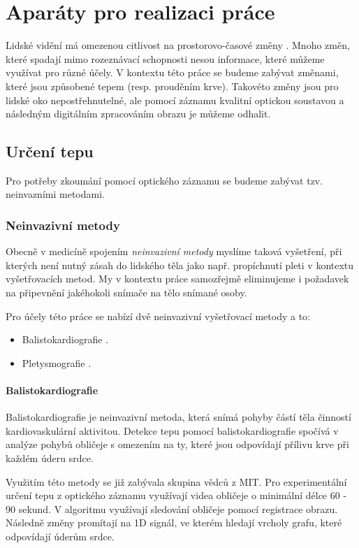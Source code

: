 \documentclass[
  digital, %
  table,   %
%
  lof,     %
  lot,     %
]{fithesis3}
\begin{document}
\chapter{Aparáty pro realizaci práce}
Lidské vidění má omezenou citlivost na prostorovo-časové změny \cite{eulerian-magnification}.
Mnoho změn, které spadají mimo rozeznávací schopnosti nesou informace, které můžeme využívat pro různé účely. V kontextu této práce se budeme zabývat změnami, které jsou způsobené tepem (resp. prouděním krve). Takovéto změny jsou pro lidské oko nepostřehnutelné, ale pomocí záznamu kvalitní optickou soustavou a následným digitálním zpracováním obrazu je můžeme odhalit.

\section{Určení tepu}
Pro potřeby zkoumání pomocí optického záznamu se budeme zabývat tzv. neinvazními metodami.

\subsection{Neinvazivní metody}
Obecně v medicíně spojením \emph{neinvazivní metody} myslíme taková vyšetření, při kterých není nutný zásah do lidského těla jako např. propíchnutí pleti v kontextu vyšetřovacích metod. My v kontextu práce samozřejmě eliminujeme i požadavek na připevnění jakéhokoli snímače na tělo snímané osoby.

Pro účely této práce se nabízí dvě neinvazivní vyšetřovací metody a to:
\begin{itemize}
	\item Balistokardiografie
    	\cite{balistography-source}.
    \item Pletysmografie
    	\cite{remote-plethysmographic}.
\end{itemize}

\subsubsection{Balistokardiografie}
Balistokardiografie je neinvazivní metoda, která snímá pohyby částí těla činností kardiovaskulární aktivitou. Detekce tepu pomocí balistokardiografie spočívá v analýze pohybů obličeje s omezením na ty, které jsou odpovídají přílivu krve při každém úderu srdce.

Využitím této metody se již zabývala skupina vědců z MIT\cite{headmotion-detection}. Pro experimentální určení tepu z optického záznamu využívají videa obličeje o minimální délce 60 - 90 sekund. V algoritmu využívají sledování obličeje pomocí registrace obrazu. Následně změny promítají na 1D signál, ve kterém hledají vrcholy grafu, které odpovídají úderům srdce.
\end{document}
